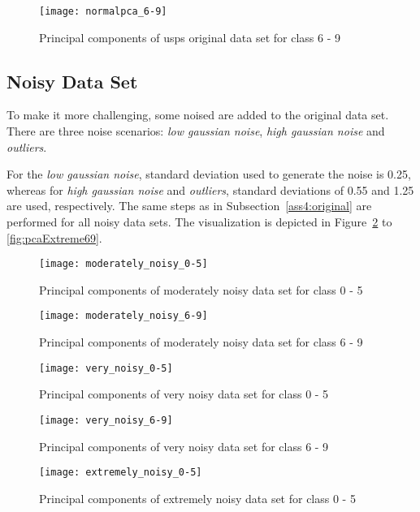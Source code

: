 \begin{figure}[h!]
	\centering
	\texttt{[image: normalpca\_6-9]}
	\caption{Principal components of usps original data set for class 6 - 9}
	\label{fig:pcaOriginal69}
\end{figure}

\subsection{Noisy Data Set}
\label{ass4:noisy}

To make it more challenging, some noised are added to the original data set. There are three noise scenarios: \textit{low gaussian noise}, \textit{high gaussian noise} and \textit{outliers}.

For the \textit{low gaussian noise}, standard deviation used to generate the noise is 0.25, whereas for \textit{high gaussian noise} and \textit{outliers}, standard deviations of 0.55 and 1.25 are used, respectively. The same steps as in Subsection~\ref{ass4:original} are performed for all noisy data sets. The visualization is depicted in Figure~\ref{fig:pcaModerate05} to \ref{fig:pcaExtreme69}.

\begin{figure}[h!]
	\centering
	\texttt{[image: moderately\_noisy\_0-5]}
	\caption{Principal components of moderately noisy data set for class 0 - 5}
	\label{fig:pcaModerate05}
\end{figure}

\begin{figure}[h!]
	\centering
	\texttt{[image: moderately\_noisy\_6-9]}
	\caption{Principal components of moderately noisy data set for class 6 - 9}
	\label{fig:pcaModerate69}
\end{figure}

\begin{figure}[h!]
	\centering
	\texttt{[image: very\_noisy\_0-5]}
	\caption{Principal components of very noisy data set for class 0 - 5}
	\label{fig:pcaVery05}
\end{figure}

\begin{figure}[h!]
	\centering
	\texttt{[image: very\_noisy\_6-9]}
	\caption{Principal components of very noisy data set for class 6 - 9}
	\label{fig:pcaVery69}
\end{figure}

\begin{figure}[h!]
	\centering
	\texttt{[image: extremely\_noisy\_0-5]}
	\caption{Principal components of extremely noisy data set for class 0 - 5}
	\label{fig:pcaExtreme05}
\end{figure}


